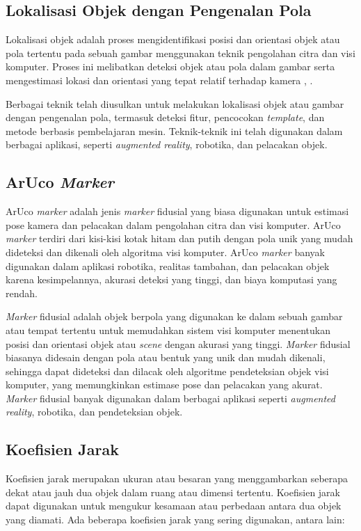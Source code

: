 \subsection{Lokalisasi Objek dengan Pengenalan Pola}
Lokalisasi objek adalah proses mengidentifikasi posisi dan orientasi objek atau pola tertentu pada sebuah gambar menggunakan teknik pengolahan citra dan visi
komputer. Proses ini melibatkan deteksi objek atau pola dalam gambar serta mengestimasi lokasi dan orientasi yang tepat relatif terhadap kamera
\cite{sivic2003video}, \cite{liu2016ssd}.

Berbagai teknik telah diusulkan untuk melakukan lokalisasi objek atau gambar dengan pengenalan pola, termasuk deteksi fitur, pencocokan \emph{template}, dan
metode berbasis pembelajaran mesin. Teknik-teknik ini telah digunakan dalam berbagai aplikasi, seperti \emph{augmented reality}, robotika, dan pelacakan objek.

\subsection{ArUco \emph{Marker}}
ArUco \emph{marker} adalah jenis \emph{marker} fidusial yang biasa digunakan untuk estimasi pose kamera dan pelacakan dalam pengolahan citra dan visi komputer. ArUco \emph{marker} terdiri dari kisi-kisi kotak hitam dan putih dengan pola unik yang mudah dideteksi dan dikenali oleh algoritma visi komputer. ArUco \emph{marker} banyak digunakan dalam aplikasi robotika, realitas tambahan, dan pelacakan objek karena kesimpelannya, akurasi deteksi yang tinggi, dan biaya komputasi yang rendah.

\emph{Marker} fidusial adalah objek berpola yang digunakan ke dalam sebuah gambar atau tempat tertentu untuk memudahkan sistem visi komputer menentukan posisi dan orientasi objek atau \emph{scene} dengan akurasi yang tinggi. \emph{Marker} fidusial biasanya didesain dengan pola atau bentuk yang unik dan mudah dikenali, sehingga dapat dideteksi dan dilacak oleh algoritme pendeteksian objek visi komputer, yang memungkinkan estimase pose dan pelacakan yang akurat. \emph{Marker} fidusial banyak digunakan dalam berbagai aplikasi seperti \emph{augmented reality}, robotika, dan pendeteksian objek.


\subsection{Koefisien Jarak}
Koefisien jarak merupakan ukuran atau besaran yang menggambarkan seberapa dekat atau jauh dua objek dalam ruang atau dimensi tertentu. Koefisien jarak dapat
digunakan untuk mengukur kesamaan atau perbedaan antara dua objek yang diamati. Ada beberapa koefisien jarak yang sering digunakan, antara lain:

